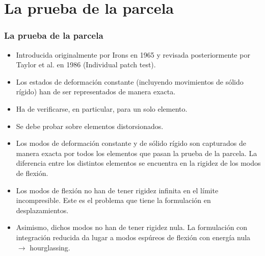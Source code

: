 \documentclass[handout]{beamer}
\begin{document}
\section{La prueba de la parcela}
\begin{frame}
\frametitle{La prueba de la parcela}
\begin{small}
\begin{itemize}
\item Introducida originalmente por Irons en 1965 y revisada posteriormente
por Taylor et al. en 1986 (Individual patch test). 
\item Los estados de deformación constante (incluyendo movimientos
de sólido rígido) han de ser representados de manera exacta.
\item Ha de verificarse, en particular, para un solo elemento.
\item Se debe probar sobre elementos distorsionados.
\item Los modos de deformación constante y de sólido rígido son
capturados de manera exacta por todos los elementos que pasan la
prueba de la parcela. La diferencia entre los distintos elementos se
encuentra en la rigidez de los modos de flexión.
\item Los modos de flexión no han de tener rigidez infinita en el
límite incompresible. Este es el problema que tiene la formulación en
desplazamientos.
\item Asimismo, dichos modos no han de tener rigidez nula.
La formulación con integración reducida da lugar
a modos espúreos de flexión con energía nula $\rightarrow$ hourglassing.
\end{itemize}
\end{small}
\end{frame}
\end{document}
